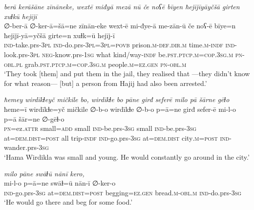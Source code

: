 \ea \label{BP.139}
\textit{berā kerāšāne zīnāneke, wextē miđyā mezā nū če noʕē bīyen ħejījīyāyčšā girten xuɫkū hejījī} \\ 
\gll ∅-ber-ā ∅-ker-ā=šā=ne zīnān-eke wext-ē mi-đye-ā me-zān-ū če noʕ-ē bīye=n ħejījī-yā=yčšā girte=n xuɫk=ū hejīj-ī \\ 
 \textsc{ind-}take.prs\textsc{-3pl} \textsc{ind-}do.prs\textsc{-3pl}\textsc{=3pl}\textsc{=\textsc{povb}} prison\textsc{.m}\textsc{-def}\textsc{.dir}\textsc{.m} time\textsc{.m}\textsc{-indf} \textsc{ind-}look.prs\textsc{-3pl} \textsc{neg-}know.prs\textsc{-\textsc{1sg}} what kind/way\textsc{-indf} be\textsc{.pst}\textsc{.ptcp}\textsc{.m}\textsc{=cop}\textsc{.3sg}\textsc{.m} \textsc{pn}\textsc{-obl}\textsc{.pl} grab\textsc{.pst}\textsc{.ptcp}\textsc{.m}\textsc{=cop}\textsc{.3sg}\textsc{.m} people\textsc{.m}\textsc{=ez.gen} \textsc{pn}\textsc{-obl}\textsc{.m} \\ 
\glt `They took [them] and put them in the jail, they realised that —they didn’t know for what reason— [but] a person from Hajij had also been arrested.'
\z 
 
\ea \label{BP.143}
\textit{ħemey wirdīkɫeyč mičkile bo, wirdīkɫe bo pāne girđ seferē milo pā šārne gēɫo} \\ 
\gll ħeme=ī wirdīkɫe=yč mičkile ∅-b-o wirdīkɫe ∅-b-o p=ā=ne girđ sefer-ē mi-l-o p=ā šār=ne ∅-gēɫ-o \\ 
 \textsc{pn}=ez.\textsc{attr} small\textsc{=add} small \textsc{ind-}be.prs\textsc{-3sg} small \textsc{ind-}be.prs\textsc{-3sg} at=\textsc{dem.dist}\textsc{=\textsc{post}} all trip\textsc{-indf} \textsc{ind-}go.prs\textsc{-3sg} at=\textsc{dem.dist} city\textsc{.m}\textsc{=\textsc{post}} \textsc{ind-}wander.prs\textsc{-3sg} \\ 
\glt `Hama Wirdikla was small and young. He would constantly go around in the city.'
\z 
 
\ea \label{BP.144}
\textit{milo pāne swāɫū nānī kero,} \\ 
\gll mi-l-o p=ā=ne swāɫ=ū nān-ī ∅-ker-o \\ 
 \textsc{ind-}go.prs\textsc{-3sg} at=\textsc{dem.dist}\textsc{=\textsc{post}} begging\textsc{=ez.gen} bread\textsc{.m}\textsc{-obl}\textsc{.m} \textsc{ind-}do.prs\textsc{-3sg} \\ 
\glt `He would go there and beg for some food.'
\z 
 
